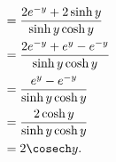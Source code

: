 \begin{enumerate}
\begin{align*}
               & = \frac{2e^{-y} + 2 \sinh y}{\sinh y \cosh y}                                                                                                 \\
               & = \frac{2 e^{-y} + e^{y} - e^{-y}} {\sinh y \cosh y}                                                                                          \\
               & = \frac{e^y - e^{-y}}{\sinh y \cosh y}                                                                                                        \\
               & = \frac{2 \cosh y}{\sinh y \cosh y}                                                                                                           \\
               & = 2 \cosech y.
          \end{align*}
\end{enumerate}